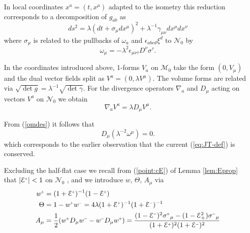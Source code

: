 \documentclass[a4paper,10pt,reqno]{amsart}
\newcommand{\cE}{\mathcal{E}}
\newcommand{\cM}{\mathcal{M}}
\newcommand{\cN}{\mathcal{N}}
\newcommand{\Th}{\Theta}
\theoremstyle{plain}
\renewcommand{\P}[1]{{{#1}^{\hspace{-.5pt}\scaleto{+}{4pt}}}}
\newcommand{\M}[1]{{{#1}^{\hspace{-.5pt}\scaleto{-}{4pt}}}}
\newcommand{\PM}[1]{{{#1}^{\hspace{-.5pt}\scaleto{\pm}{3.5pt}}}}
\numberwithin{equation}{section}
\begin{document}
In local  coordinates $x^{a}=(t,x^{\mu})$ adapted to the isometry this
reduction corresponds to a decomposition of $g_{ab}$ as
\begin{equation}
ds^{2} = \lambda(dt + \sigma_{\mu}dx^{\mu})^{2} + 
\lambda^{-1} \gamma_{\mu\nu} dx^{\mu} dx^{\nu} \label{2ds}
\end{equation}
where $\sigma_{\mu}$ is related to the pullbacks of $\omega_{a}$ and
$\epsilon_{abcd} \xi^{d}$ to $\cN_0$ by
\begin{equation}
\omega_{\mu} = - \lambda^{2} \epsilon_{\mu\nu\tau} D^{\nu} \sigma^{\tau}.
\label{omdes}
\end{equation}



In the coordinates introduced above, 1-forms $V_{a}$  on $\cM_0$ take the form
$(0, V_{\mu})$ and the dual vector fields split as $V^{a} = (0, \lambda V^{\mu})$.
The volume forms are related via 
$\sqrt{ \det g} = \lambda^{-1}  \sqrt{\det \gamma}$.
For the divergence operators $\nabla_a$ and $D_{\mu}$ acting on vectors  $V^a$ on $\cN_0$ we obtain 
\begin{equation}
\nabla_{a} V^{a} =  \lambda D_{\mu}  V^{\mu}.
\end{equation} 

%
%
%
%
%

%
From (\ref{omdes}) it  follows that
\begin{equation}
\label{divom}
D_{\mu} (\lambda^{-2} \omega^{\mu}) = 0.
\end{equation}
which corresponds to the earlier observation that the current (\ref{eq:JT-def}) is conserved.

Excluding the half-flat case we recall from (\ref{point:cE}) of Lemma \ref{lem:Eprop} that  $|\PM{\cE}| < 1$ 
on $\cN_0$ , and  we introduce $w$, $\Th$, $A_{\mu}$ via
\begin{align}
 \label{w}
\PM{w} ={}& (1+ \PM{\cE})^{-1}(1 -  \PM{\cE})  \\
\Theta ={}& 1 - \P{w}\M{w} =  4 \lambda (1 + \P{\cE})^{-1} (1 + \M{\cE})^{-1} \label{Th} \\
  A_{\mu} ={}& \frac{1}{2}(\P{w}D_{\mu}\M{w}-\M{w}D_{\mu}\P{w}) = \frac{(1 - \M{\cE})^2 \P{\sigma}_{\mu} - (1 - \cE_+^2) \M{\sigma}_{\mu}}
{(1 + \P{\cE})^2 (1 + \M{\cE})^2}
\label{A}
\end{align}
\end{document}
